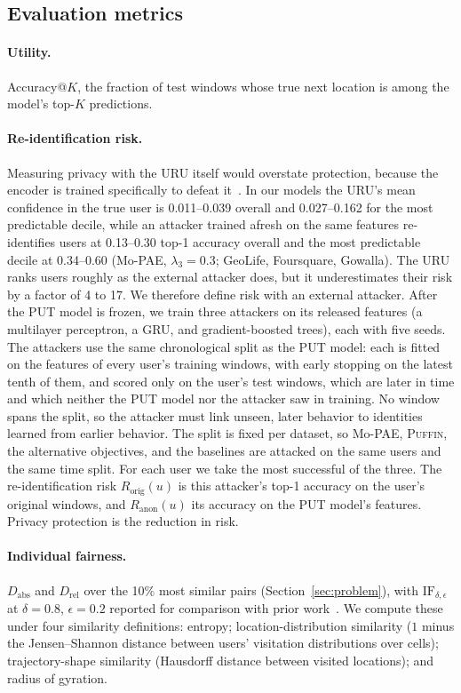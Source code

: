 \documentclass[sigconf,anonymous,review]{acmart}
\newcommand{\puffin}{\textsc{Puffin}}
\begin{document}
\subsection{Evaluation metrics}
\label{sec:metrics}
\paragraph{Utility.} Accuracy@$K$, the fraction of test windows whose true next location is among the model's top-$K$ predictions.

\paragraph{Re-identification risk.} Measuring privacy with the URU itself would overstate protection, because the encoder is trained specifically to defeat it~\cite{elazar2018adversarial}. In our models the URU's mean confidence in the true user is 0.011--0.039 overall and 0.027--0.162 for the most predictable decile, while an attacker trained afresh on the same features re-identifies users at 0.13--0.30 top-1 accuracy overall and the most predictable decile at 0.34--0.60 (Mo-PAE, $\lambda_3=0.3$; GeoLife, Foursquare, Gowalla). The URU ranks users roughly as the external attacker does, but it underestimates their risk by a factor of 4 to 17. We therefore define risk with an external attacker. After the PUT model is frozen, we train three attackers on its released features (a multilayer perceptron, a GRU, and gradient-boosted trees), each with five seeds. The attackers use the same chronological split as the PUT model: each is fitted on the features of every user's training windows, with early stopping on the latest tenth of them, and scored only on the user's test windows, which are later in time and which neither the PUT model nor the attacker saw in training. No window spans the split, so the attacker must link unseen, later behavior to identities learned from earlier behavior. The split is fixed per dataset, so Mo-PAE, \puffin{}, the alternative objectives, and the baselines are attacked on the same users and the same time split. For each user we take the most successful of the three. The re-identification risk $R_{\mathrm{orig}}(u)$ is this attacker's top-1 accuracy on the user's original windows, and $R_{\mathrm{anon}}(u)$ its accuracy on the PUT model's features. Privacy protection is the reduction in risk.

\paragraph{Individual fairness.} $D_{\mathrm{abs}}$ and $D_{\mathrm{rel}}$ over the 10\% most similar pairs (Section~\ref{sec:problem}), with $\mathrm{IF}_{\delta,\epsilon}$ at $\delta=0.8$, $\epsilon=0.2$ reported for comparison with prior work~\cite{zhan2023fairness}. We compute these under four similarity definitions: entropy; location-distribution similarity ($1$ minus the Jensen--Shannon distance between users' visitation distributions over cells); trajectory-shape similarity (Hausdorff distance between visited locations); and radius of gyration.
\end{document}
